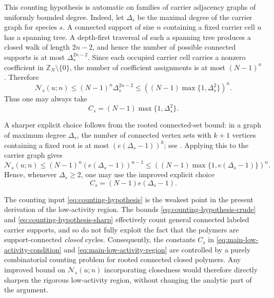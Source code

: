 This counting hypothesis is automatic on families of carrier adjacency graphs of uniformly
bounded degree. Indeed, let \(\Delta_s\) be the maximal degree of the carrier graph for
species \(s\). A connected support of size \(n\) containing a fixed carrier cell \(u\) has a
spanning tree. A depth-first traversal of such a spanning tree produces a closed walk of
length \(2n-2\), and hence the number of possible connected supports is at most
\(\Delta_s^{2n-2}\). Since each occupied carrier cell carries a nonzero coefficient in
\(\mathbb Z_N\setminus\{0\}\), the number of coefficient assignments is at most \((N-1)^n\).
Therefore
\begin{equation}
	\mathcal N_s(u;n)
	\le
	(N-1)^n\Delta_s^{2n-2}
	\le
	\left((N-1)\max\{1,\Delta_s^2\}\right)^n.
	\label{eq:counting-hypothesis-crude}
\end{equation}
Thus one may always take
\begin{equation}
	C_s=(N-1)\max\{1,\Delta_s^2\}.
	\label{eq:Cs-crude}
\end{equation}

A sharper explicit choice follows from the rooted connected-set bound: in a graph of
maximum degree \(\Delta_s\), the number of connected vertex sets with \(k+1\) vertices containing
a fixed root is at most \((e(\Delta_s-1))^k\); see \cite[p.~2]{KangasEtAl2018}. Applying this to
the carrier graph gives
\begin{equation}
	\mathcal N_s(u;n)
	\le
	(N-1)^n \left(e(\Delta_s-1)\right)^{n-1}
	\le
	\left((N-1)\max\{1,e(\Delta_s-1)\}\right)^n.
	\label{eq:counting-hypothesis-sharp}
\end{equation}
Hence, whenever \(\Delta_s\ge 2\), one may use the improved explicit choice
\begin{equation}
	C_s=(N-1)e(\Delta_s-1).
	\label{eq:Cs-sharp}
\end{equation}

\begin{remark}
	\label{rem:counting-bottleneck}
	The counting input \eqref{eq:counting-hypothesis} is the weakest point in the
	present derivation of the low-activity region. The bounds
	\eqref{eq:counting-hypothesis-crude} and \eqref{eq:counting-hypothesis-sharp}
	effectively count general connected labeled carrier supports, and so do not
	fully exploit the fact that the polymers are support-connected \emph{closed}
	cycles. Consequently, the constants \(C_s\) in
	\eqref{eq:main-low-activity-condition} and
	\eqref{eq:main-low-activity-region} are controlled by a purely combinatorial
	counting problem for rooted connected closed polymers. Any improved bound on
	\(\mathcal N_s(u;n)\) incorporating closedness would therefore directly
	sharpen the rigorous low-activity region, without changing the analytic part
	of the argument.
\end{remark}



